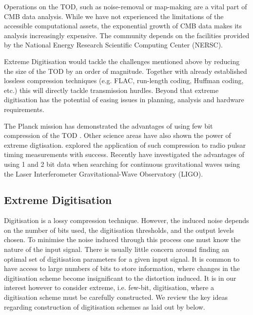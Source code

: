 \documentclass[apj]{emulateapj}
\begin{document}

Operations on the TOD, such as noise-removal or map-making are a vital part of CMB data analysis. While we have not experienced the limitations of the accessible computational assets, the exponential growth of CMB data makes its analysis increasingly expensive. The community depends on the facilities provided by the National Energy Research Scientific Computing Center (NERSC).


Extreme Digitisation would tackle the challenges mentioned above by reducing the size of the TOD by an order of magnitude. Together with already established lossless compression techniques (e.g. FLAC, run-length coding, Huffman coding, etc.) this will directly tackle transmission hurdles. Beyond that extreme digitisation has the potential of easing issues in planning, analysis and hardware requirements.

The Planck mission has demonstrated the advantages of using few bit compression of the TOD \citep{maris2003}. Other science areas have also shown the power of extreme digtisation. \citep{jenet1998} explored the application of such compression to radio pulsar timing measurements with success. Recently \citep{clearwater2018} have investigated the advantages of using 1 and 2 bit data when searching for continuous gravitational waves using the Laser Interferometer Gravitational-Wave Observatory (LIGO).


\subsection{Extreme Digitisation}
\label{subsec:extremedigitisation}

Digitisation is a lossy compression technique. However, the induced noise depends on the number of bits used, the digitisation thresholds, and the output levels chosen. To minimise the noise induced through this process one must know the nature of the input signal. There is usually little concern around finding an optimal set of digitisation parameters for a given input signal. It is common to have access to large numbers of bits to store information, where changes in the digitisation scheme become insignificant to the distortion induced. It is in our interest however to consider extreme, i.e. few-bit, digitisation, where a digitisation scheme must be carefully constructed. We review the key ideas regarding construction of digitisation schemes as laid out by \cite{max1960} below.
\end{document}
